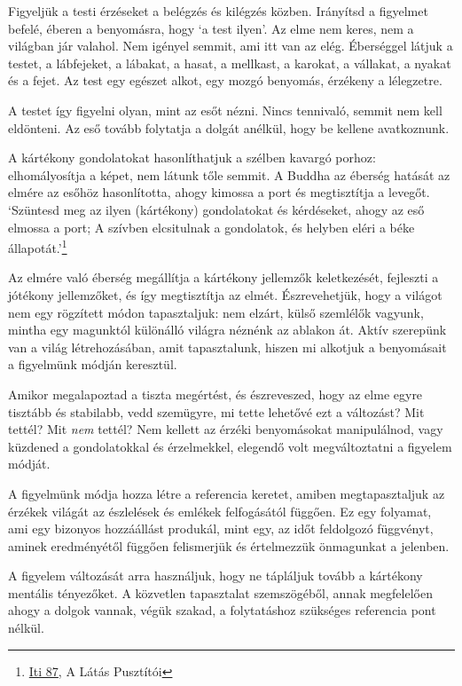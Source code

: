 Figyeljük a testi érzéseket a belégzés és kilégzés közben. Irányítsd a
figyelmet befelé, éberen a benyomásra, hogy `a test ilyen'. Az elme nem
keres, nem a világban jár valahol. Nem igényel semmit, ami itt van az
elég. Éberséggel látjuk a testet, a lábfejeket, a lábakat, a hasat, a
mellkast, a karokat, a vállakat, a nyakat és a fejet. Az test egy
egészet alkot, egy mozgó benyomás, érzékeny a lélegzetre.

A testet így figyelni olyan, mint az esőt nézni. Nincs tennivaló, semmit
nem kell eldönteni. Az eső tovább folytatja a dolgát anélkül, hogy be
kellene avatkoznunk.


A kártékony gondolatokat hasonlíthatjuk a szélben kavargó porhoz:
elhomályosítja a képet, nem látunk tőle semmit. A Buddha az éberség
hatását az elmére az esőhöz hasonlította, ahogy kimossa a port és
megtisztítja a levegőt. `Szüntesd meg az ilyen (kártékony) gondolatokat
és kérdéseket, ahogy az eső elmossa a port; A szívben elcsitulnak a
gondolatok, és helyben eléri a béke állapotát.'\footnote{\href{https://suttacentral.net/iti87/en/sujato}{Iti
  87}, A Látás Pusztítói}

Az elmére való éberség megállítja a kártékony jellemzők keletkezését,
fejleszti a jótékony jellemzőket, és így megtisztítja az elmét.
Észrevehetjük, hogy a világot nem egy rögzített módon tapasztaljuk: nem
elzárt, külső szemlélők vagyunk, mintha egy magunktól különálló világra
néznénk az ablakon át. Aktív szerepünk van a világ létrehozásában, amit
tapasztalunk, hiszen mi alkotjuk a benyomásait a figyelmünk módján
keresztül.

Amikor megalapoztad a tiszta megértést, és észreveszed, hogy az elme
egyre tisztább és stabilabb, vedd szemügyre, mi tette lehetővé ezt a
változást? Mit tettél? Mit \emph{nem} tettél? Nem kellett az érzéki
benyomásokat manipulálnod, vagy küzdened a gondolatokkal és érzelmekkel,
elegendő volt megváltoztatni a figyelem módját.

A figyelmünk módja hozza létre a referencia keretet, amiben
megtapasztaljuk az érzékek világát az észlelések és emlékek felfogásától
függően. Ez egy folyamat, ami egy bizonyos hozzáállást produkál, mint
egy, az időt feldolgozó függvényt, aminek eredményétől függően
felismerjük és értelmezzük önmagunkat a jelenben.

A figyelem változását arra használjuk, hogy ne tápláljuk tovább a
kártékony mentális tényezőket. A közvetlen tapasztalat szemszögéből,
annak megfelelően ahogy a dolgok vannak, végük szakad, a folytatáshoz
szükséges referencia pont nélkül.


